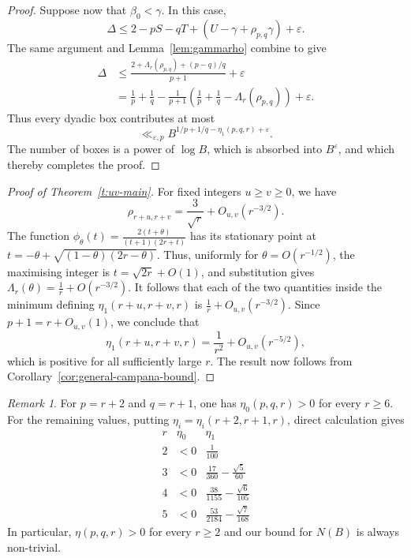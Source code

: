 \documentclass[a4paper,11pt,twoside,reqno]{amsart}
\theoremstyle{definition}
\theoremstyle{remark}
\newtheorem{remark}[theorem]{Remark}
\numberwithin{equation}{section}
\newcommand\ve{\varepsilon}
\newcommand\1{\mathbf{1}}
\renewcommand{\leq}{\leqslant}
\renewcommand{\geq}{\geqslant}
\begin{document}
\begin{proof}
Suppose now that $\beta_0<\gamma$. In this case,
\[
\Delta
 \leq
 2-pS-qT+(U-\gamma+\rho_{p,q}\gamma)+\varepsilon.
\]
The same argument and Lemma~\ref{lem:gammarho} combine to give
\begin{align*}
\Delta
& \leq
 \frac{
 2+\Lambda_r(\rho_{p,q})+(p-q)/q
 }{p+1}
 +\varepsilon\\
 &=
\frac1p+\frac1q
 -
 \frac1{p+1}
 \left(
 \frac1p+\frac1q-\Lambda_r(\rho_{p,q})
 \right)
 +\varepsilon.
\end{align*}
Thus every dyadic box contributes at most
\[
\ll_{\ve,p}B^{1/p+1/q-\eta_1(p,q,r)+\varepsilon}.
\]
The number of boxes is a power of $\log B$, which is absorbed
into $B^\varepsilon$, and which thereby completes the proof.
\end{proof}

\begin{proof}[Proof of Theorem~\ref{t:uv-main}]
For fixed integers $u\geq v\geq0$, we have 
\[
\rho_{r+u,r+v}
 =
 \frac3{\sqrt r}+O_{u,v}(r^{-3/2}).
\]
The function $\phi_\theta(t)= \frac{2(t+\theta)}{(t+1)(2r+t)}$ has its stationary point at 
$t=-\theta+\sqrt{(1-\theta)(2r-\theta)}$. Thus, uniformly for $\theta=O(r^{-1/2})$, the maximising integer is $t=\sqrt{2r}+O(1)$, and substitution gives
$\Lambda_r(\theta)
 =
 \frac1r+O(r^{-3/2})$.
It follows that each of the two quantities inside the minimum
defining $\eta_1(r+u,r+v,r)$ is
$\frac1r+O_{u,v}(r^{-3/2})$.
Since $p+1=r+O_{u,v}(1)$, we conclude that
\[
\eta_1(r+u,r+v,r)
 =
 \frac1{r^2}+O_{u,v}(r^{-5/2}),
\]
which is positive for all sufficiently large $r$. The result now follows from 
Corollary~\ref{cor:general-campana-bound}.
\end{proof}

\begin{remark}\label{rem:rem'}
For $p=r+2$ and $q=r+1$, one has
$\eta_0(p,q,r)>0$ for every $r\geq6$. For the remaining values,
putting $\eta_i=\eta_i(r+2,r+1,r)$,
direct calculation gives
\[
\begin{array}{c|cc}
 r & \eta_0 & \eta_1 \\ \hline
 2 & <0 & \frac1{100} \\[4pt]
 3 & <0 & 
 \frac{17}{360}-\frac{\sqrt5}{60} \\[6pt]
 4 & <0 & 
 \frac{38}{1155}-\frac{\sqrt6}{105} \\[6pt]
 5 & <0 & 
 \frac{53}{2184}-\frac{\sqrt7}{168}
\end{array}
\]
In particular, $\eta(p,q,r)>0$ for every $r\geq2$ and our bound for $N(B)$ is
always non-trivial.
\end{remark}
\end{document}
